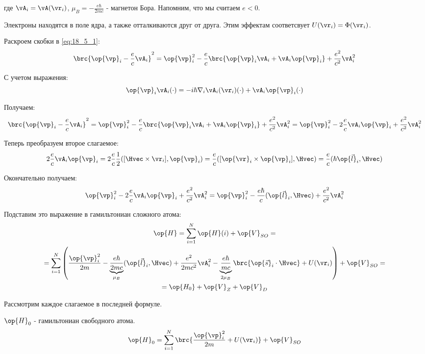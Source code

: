 где $\vA_i = \vA(\vr_i)$, $\mu_B = -\frac{e\hbar}{2mc}$ - магнетон Бора. Напомним, что мы считаем $e < 0$.

Электроны находятся в поле ядра, а также отталкиваются друг от друга. Этим эффектам соответсвует $U(\vr_i) = \Phi(\vr_i)$.

Раскроем скобки в \eqref{eq:18_5_1}:
\begin{gather*}
\brc{\op{\vp}_i - \frac{e}{c}\vA_i}^2 = \op{\vp}_i^2 - \frac{e}{c}\brc{\op{\vp}_i \vA_i + \vA_i \op{\vp}_i} + \frac{e^2}{c^2}\vA_i^2 
\end{gather*}

С учетом выражения:
$$
\op{\vp}_i \vA_i (\cdot) = -i\hbar \nabla_i \vA_i(\vr_i)(\cdot) + \vA_i \op{\vp}_i(\cdot)
$$

Получаем:
\begin{gather*}
\brc{\op{\vp}_i - \frac{e}{c}\vA_i}^2 = \op{\vp}_i^2 - \frac{e}{c}\brc{\op{\vp}_i \vA_i + \vA_i \op{\vp}_i} + \frac{e^2}{c^2}\vA_i^2 = \op{\vp}_i^2 - 2\frac{e}{c}\vA_i \op{\vp}_i + \frac{e^2}{c^2}\vA_i^2
\end{gather*}

Теперь преобразуем второе слагаемое:
$$
2\frac{e}{c}\vA_i \op{\vp}_i = 2\frac{e}{c} \frac{1}{2}([\Hvec \times \vr_i], \op{\vp}_i) = \frac{e}{c}([\op{\vr}_i \times \op{\vp}_i], \Hvec) =\frac{e}{c}(\hbar \op{\vec{l}}_i, \Hvec)   
$$

Окончательно получаем:
\begin{gather*}
\op{\vp}_i^2 - 2\frac{e}{c}\vA_i \op{\vp}_i + \frac{e^2}{c^2}\vA_i^2 = \op{\vp}_i^2 - \frac{e\hbar}{c}(\op{\vec{l}}_i, \Hvec) + \frac{e^2}{c^2}\vA_i^2
\end{gather*}

Подставим это выражение в гамильтониан сложного атома:
\begin{gather}
\label{eq:18_5_2}
\op{H} = \sum_{i=1}^N \op{H}(i) + \op{V}_{SO} =  \nonumber \\
= \sum_{i=1}^N \left ( {\frac{\op{\vp}_i^2}{2m} - \underbrace{\frac{e\hbar}{2mc}}_{\mu_B}(\op{\vec{l}}_i, \Hvec) + \frac{e^2}{2mc^2}\vA_i^2 - \underbrace{\frac{e\hbar}{mc}}_{2\mu_B}\brc{\op{\vec{s}}_i \cdot \Hvec}} + U(\vr_i) \right ) + \op{V}_{SO} =  \nonumber \\ 
= \op{H_0} + \op{V}_Z +\op{V}_D
\end{gather}

Рассмотрим каждое слагаемое в последней формуле.

$\op{H}_0$ - гамильтониан свободного атома.
$$
\op{H}_0 =  \sum_{i=1}^N \brc{\frac{\op{\vp}_i^2}{2m}  + U(\vr_i)} + \op{V}_{SO}
$$

